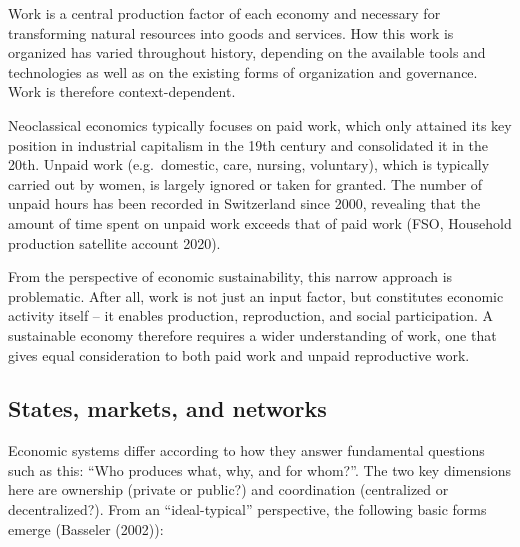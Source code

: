 \documentclass[
  a4paper,
  openany]{book}
\begin{document}
\begin{tcolorbox}[enhanced jigsaw, coltitle=black, bottomtitle=1mm, opacitybacktitle=0.6, titlerule=0mm, opacityback=0, leftrule=.75mm, colbacktitle=quarto-callout-note-color!10!white, bottomrule=.15mm, toptitle=1mm, breakable, title={Work is more than paid work}, arc=.35mm, rightrule=.15mm, toprule=.15mm, left=2mm, colback=white, colframe=quarto-callout-note-color-frame]

Work is a central production factor of each economy and necessary for
transforming natural resources into goods and services. How this work is
organized has varied throughout history, depending on the available
tools and technologies as well as on the existing forms of organization
and governance. Work is therefore context-dependent.

Neoclassical economics typically focuses on paid work, which only
attained its key position in industrial capitalism in the 19th century
and consolidated it in the 20th. Unpaid work (e.g.~domestic, care,
nursing, voluntary), which is typically carried out by women, is largely
ignored or taken for granted. The number of unpaid hours has been
recorded in Switzerland since 2000, revealing that the amount of time
spent on unpaid work exceeds that of paid work (FSO, Household
production satellite account 2020).

From the perspective of economic sustainability, this narrow approach is
problematic. After all, work is not just an input factor, but
constitutes economic activity itself -- it enables production,
reproduction, and social participation. A sustainable economy therefore
requires a wider understanding of work, one that gives equal
consideration to both paid work and unpaid reproductive work.

\end{tcolorbox}

\subsection{States, markets, and
networks}\label{states-markets-and-networks}

Economic systems differ according to how they answer fundamental
questions such as this: ``Who produces what, why, and for whom?''. The
two key dimensions here are ownership (private or public?) and
coordination (centralized or decentralized?). From an ``ideal-typical''
perspective, the following basic forms emerge (Basseler (2002)):
\end{document}
